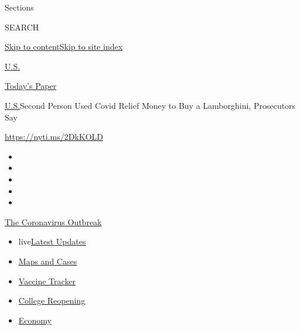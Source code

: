 Sections

SEARCH

\protect\hyperlink{site-content}{Skip to
content}\protect\hyperlink{site-index}{Skip to site index}

\href{https://www.nytimes.com/section/us}{U.S.}

\href{https://myaccount.nytimes.com/auth/login?response_type=cookie\&client_id=vi}{}

\href{https://www.nytimes.com/section/todayspaper}{Today's Paper}

\href{/section/us}{U.S.}\textbar{}Second Person Used Covid Relief Money
to Buy a Lamborghini, Prosecutors Say

\url{https://nyti.ms/2DkKOLD}

\begin{itemize}
\item
\item
\item
\item
\item
\end{itemize}

\href{https://www.nytimes.com/news-event/coronavirus?action=click\&pgtype=Article\&state=default\&region=TOP_BANNER\&context=storylines_menu}{The
Coronavirus Outbreak}

\begin{itemize}
\tightlist
\item
  live\href{https://www.nytimes.com/2020/08/04/world/coronavirus-cases.html?action=click\&pgtype=Article\&state=default\&region=TOP_BANNER\&context=storylines_menu}{Latest
  Updates}
\item
  \href{https://www.nytimes.com/interactive/2020/us/coronavirus-us-cases.html?action=click\&pgtype=Article\&state=default\&region=TOP_BANNER\&context=storylines_menu}{Maps
  and Cases}
\item
  \href{https://www.nytimes.com/interactive/2020/science/coronavirus-vaccine-tracker.html?action=click\&pgtype=Article\&state=default\&region=TOP_BANNER\&context=storylines_menu}{Vaccine
  Tracker}
\item
  \href{https://www.nytimes.com/2020/08/02/us/covid-college-reopening.html?action=click\&pgtype=Article\&state=default\&region=TOP_BANNER\&context=storylines_menu}{College
  Reopening}
\item
  \href{https://www.nytimes.com/live/2020/08/04/business/stock-market-today-coronavirus?action=click\&pgtype=Article\&state=default\&region=TOP_BANNER\&context=storylines_menu}{Economy}
\end{itemize}

